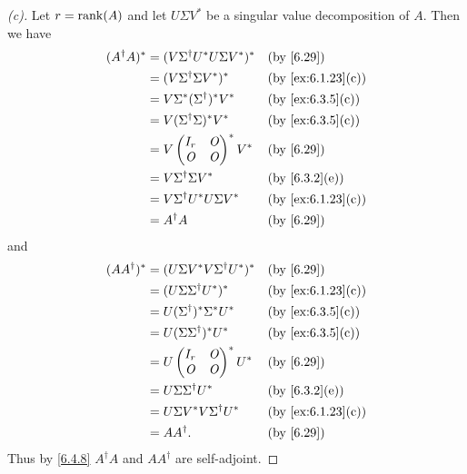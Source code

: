 \begin{proof}[(c)]
  Let \(r = \rk{A}\) and let \(U \Sigma V^*\) be a singular value decomposition of \(A\).
  Then we have
  \begin{align*}
    (A^{\dag} A)^* & = (V \Sigma^{\dag} U^* U \Sigma V^*)^* &  & \by{6.29}         \\
                   & = (V \Sigma^{\dag} \Sigma V^*)^*       &  & \by{ex:6.1.23}[c] \\
                   & = V \Sigma^* (\Sigma^{\dag})^* V^*     &  & \by{ex:6.3.5}[c]  \\
                   & = V (\Sigma^{\dag} \Sigma)^* V^*       &  & \by{ex:6.3.5}[c]  \\
                   & = V \begin{pmatrix}
                           I_r & \zm \\
                           \zm & \zm
                         \end{pmatrix}^* V^*                    &  & \by{6.29}     \\
                   & = V \Sigma^{\dag} \Sigma V^*           &  & \by{6.3.2}[e]     \\
                   & = V \Sigma^{\dag} U^* U \Sigma V^*     &  & \by{ex:6.1.23}[c] \\
                   & = A^{\dag} A                           &  & \by{6.29}
  \end{align*}
  and
  \begin{align*}
    (A A^{\dag})^* & = (U \Sigma V^* V \Sigma^{\dag} U^*)^* &  & \by{6.29}         \\
                   & = (U \Sigma \Sigma^{\dag} U^*)^*       &  & \by{ex:6.1.23}[c] \\
                   & = U (\Sigma^{\dag})^* \Sigma^* U^*     &  & \by{ex:6.3.5}[c]  \\
                   & = U (\Sigma \Sigma^{\dag})^* U^*       &  & \by{ex:6.3.5}[c]  \\
                   & = U \begin{pmatrix}
                           I_r & \zm \\
                           \zm & \zm
                         \end{pmatrix}^* U^*                    &  & \by{6.29}     \\
                   & = U \Sigma \Sigma^{\dag} U^*           &  & \by{6.3.2}[e]     \\
                   & = U \Sigma V^* V \Sigma^{\dag} U^*     &  & \by{ex:6.1.23}[c] \\
                   & = A A^{\dag}.                          &  & \by{6.29}
  \end{align*}
  Thus by \cref{6.4.8} \(A^{\dag} A\) and \(A A^{\dag}\) are self-adjoint.
\end{proof}
